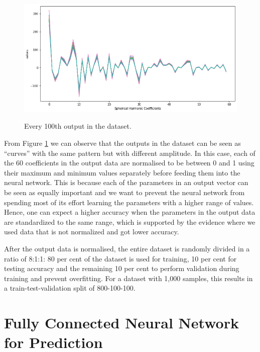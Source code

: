 \begin{figure}[H]
    \centering
    \caption{Every 100th output in the dataset.}
    \includegraphics[scale=0.5]{figures/geoid_images/Geoid_sample_output.png}
    \label{figure:geoid_output}
\end{figure}

From Figure \ref{figure:geoid_output} we can observe that the outputs in the dataset can be seen as ``curves'' with the same pattern but with different amplitude. In this case, each of the 60 coefficients in the output data are normalised to be between 0 and 1 using their maximum and minimum values separately before feeding them into the neural network. This is because each of the parameters in an output vector can be seen as equally important and we want to prevent the neural network from spending most of its effort learning the parameters with a higher range of values. Hence, one can expect a higher accuracy when the parameters in the output data are standardized to the same range, which is supported by the evidence where we used data that is not normalized and got lower accuracy.

After the output data is normalised, the entire dataset is randomly divided in a ratio of 8:1:1: 80 per cent of the dataset is used for training, 10 per cent for testing accuracy and the remaining 10 per cent to perform validation during training and prevent overfitting. For a dataset with 1,000 samples, this results in a train-test-validation split of 800-100-100.

\section{Fully Connected Neural Network for Prediction}

